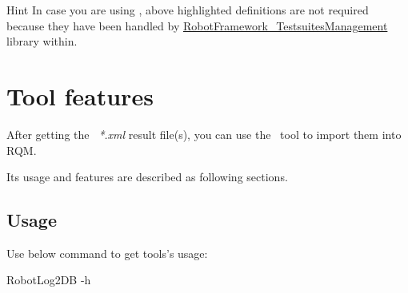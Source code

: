 \begin{boxhint} {Hint}
  In case you are using \rfw, above highlighted definitions are
  not required because they have been handled by
  \href{https://github.com/test-fullautomation/robotframework-testsuitesmanagement}
  {RobotFramework\_TestsuitesManagement} library within.
\end{boxhint}

\hypertarget{description-tool-features}{%
\section{Tool features}\label{description-tool-features}}

After getting the \rfwcore\ \emph{*.xml} result file(s), you can use the \pkg\ tool to
import them into RQM.

Its usage and features are described as following sections.

\subsection{Usage}
Use below command to get tools's usage:
\begin{robotlog}
RobotLog2DB -h
\end{robotlog}

